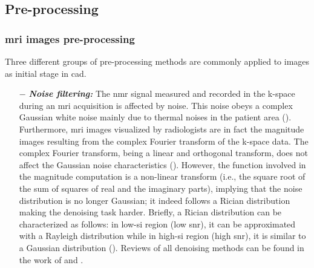 \def\rmm#1{{\bf \sc Robert: }{\marrow\sf #1}}


\subsection{Pre-processing} \label{subsec:preprocessing}

\subsubsection{\ac{mri} images pre-processing}

Three different groups of pre-processing methods are commonly applied to images as initial stage in \ac{cad}.

\begin{enumerate}[leftmargin=*]


\item[$-$] \textbf{\textit{Noise filtering:}} The \ac{nmr} signal measured and recorded in the k-space during an \ac{mri} acquisition is affected by noise. This noise obeys a complex Gaussian white noise mainly due to thermal noises in the patient area (\cite{Nowak1999}). Furthermore, \ac{mri} images visualized by radiologists are in fact the magnitude images resulting from the complex Fourier transform of the k-space data. The complex Fourier transform, being a linear and orthogonal transform, does not affect the Gaussian noise characteristics (\cite{Nowak1999}). However, the function involved in the magnitude computation is a non-linear transform (i.e., the square root of the sum of squares of real and the imaginary parts), implying that the noise distribution is no longer Gaussian; it indeed follows a Rician distribution making the denoising task harder. Briefly, a Rician distribution can be characterized as follows: in low-\ac{si} region (low \ac{snr}), it can be approximated with a Rayleigh distribution while in high-\ac{si} region (high \ac{snr}), it is similar to a Gaussian distribution (\cite{Manjon2008}). Reviews of all denoising methods can be found in the work of \cite{Buades2005} and \cite{Mohan2014}.


\end{enumerate}
